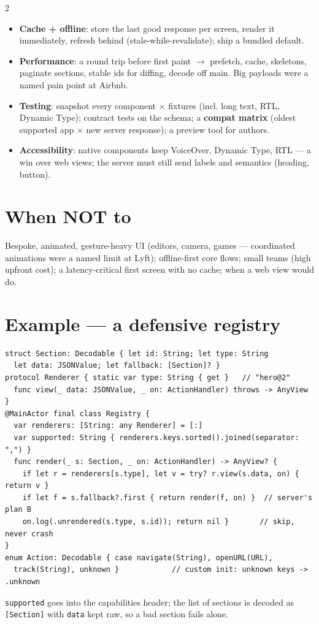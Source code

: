 \documentclass[8pt]{extarticle}
\newcommand\ct[1]{\texttt{#1}}
\begin{document}
\begin{multicols}{2}
\begin{itemize}
        client; the server re-validates.
  \item \textbf{Cache + offline}: store the last good response per screen, render it
        immediately, refresh behind (stale-while-revalidate); ship a bundled default.
  \item \textbf{Performance}: a round trip before first paint $\to$ prefetch, cache,
        skeletons, paginate sections, stable ids for diffing, decode off main. Big payloads
        were a named pain point at Airbnb.
  \item \textbf{Testing}: snapshot every component × fixtures (incl. long text, RTL,
        Dynamic Type); contract tests on the schema; a \textbf{compat matrix} (oldest
        supported app × new server response); a preview tool for authors.
  \item \textbf{Accessibility}: native components keep VoiceOver, Dynamic Type, RTL — a win
        over web views; the server must still send labels and semantics (heading, button).
\end{itemize}

\section{When NOT to}
Bespoke, animated, gesture-heavy UI (editors, camera, games — coordinated animations were a
named limit at Lyft); offline-first core flows; small teams (high upfront cost); a
latency-critical first screen with no cache; when a web view would do.

\columnbreak

\section{Example — a defensive registry}
\begin{lstlisting}[language=SwiftSheet]
struct Section: Decodable { let id: String; let type: String
  let data: JSONValue; let fallback: [Section]? }
protocol Renderer { static var type: String { get }   // "hero@2"
  func view(_ data: JSONValue, _ on: ActionHandler) throws -> AnyView }
@MainActor final class Registry {
  var renderers: [String: any Renderer] = [:]
  var supported: String { renderers.keys.sorted().joined(separator: ",") }
  func render(_ s: Section, _ on: ActionHandler) -> AnyView? {
    if let r = renderers[s.type], let v = try? r.view(s.data, on) { return v }
    if let f = s.fallback?.first { return render(f, on) }  // server's plan B
    on.log(.unrendered(s.type, s.id)); return nil }       // skip, never crash
}
enum Action: Decodable { case navigate(String), openURL(URL),
  track(String), unknown }            // custom init: unknown keys -> .unknown
\end{lstlisting}
{\scriptsize \ct{supported} goes into the capabilities header; the list of sections is decoded
as \ct{[Section]} with \ct{data} kept raw, so a bad section fails alone.\par}


\end{multicols}
\end{document}
